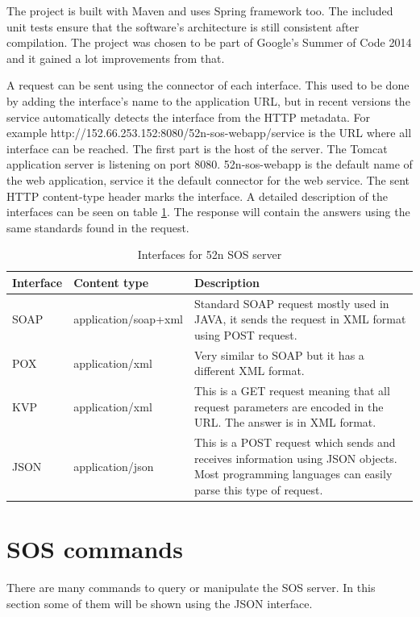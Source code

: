 The project is built with Maven and uses Spring framework too. The included unit tests ensure that the software's architecture is still consistent after compilation. The project was chosen to be part of Google's Summer of Code 2014 and it gained a lot improvements from that. 

A request can be sent using the connector of each interface. This used to be done by adding the interface's name to the application URL, but in recent versions the service automatically detects the interface from the HTTP metadata. For example http://152.66.253.152:8080/52n-sos-webapp/service is the URL where all interface can be reached. The first part is the host of the server. The Tomcat application server is listening on port 8080. 52n-sos-webapp is the default name of the web application, service it the default connector for the web service. The sent HTTP content-type header marks the interface. A detailed description of the interfaces can be seen on table \ref{tab:services}. The response will contain the answers using the same standards found in the request.
\begin{table}[h]
\begin{center}
\begin{tabular}{| l | l | p{8cm} |}
\hline
Interface  & Content type & Description \\ \hline \hline
SOAP & application/soap+xml & Standard SOAP request mostly used in JAVA, it sends the request in XML format using POST request. \\ \hline
POX & application/xml & Very similar to SOAP but it has a different XML format. \\ \hline
KVP & application/xml & This is a GET request meaning that all request parameters are encoded in the URL. The answer is in XML format. \\ \hline
JSON & application/json & This is a POST request which sends and receives information using JSON objects. Most programming languages can easily parse this type of request.\\ \hline
\end{tabular}
\caption{Interfaces for 52n SOS server\label{tab:services}}
\end{center}
\end{table}


\section{SOS commands}
There are many commands to query or manipulate the SOS server. In this section some of them will be shown using the JSON interface. 

